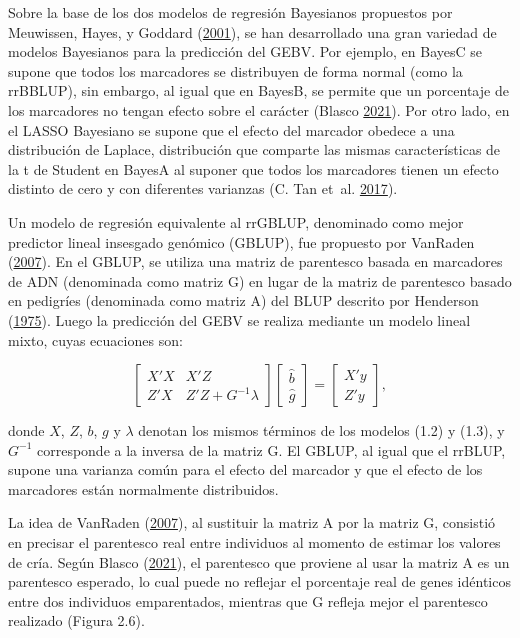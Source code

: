 \documentclass[11pt,spanish,a4paper,oneside,]{book} %
\begin{document}
Sobre la base de los dos modelos de regresión Bayesianos propuestos por Meuwissen, Hayes, y Goddard (\protect\hyperlink{ref-cite:8}{2001}), se han desarrollado una gran variedad de modelos Bayesianos para la predicción del GEBV. Por ejemplo, en BayesC se supone que todos los marcadores se distribuyen de forma normal (como la rrBBLUP), sin embargo, al igual que en BayesB, se permite que un porcentaje de los marcadores no tengan efecto sobre el carácter (Blasco \protect\hyperlink{ref-cite:21}{2021}). Por otro lado, en el LASSO Bayesiano se supone que el efecto del marcador obedece a una distribución de Laplace, distribución que comparte las mismas características de la t de Student en BayesA al suponer que todos los marcadores tienen un efecto distinto de cero y con diferentes varianzas (C. Tan et~al. \protect\hyperlink{ref-cite:34}{2017}).

Un modelo de regresión equivalente al rrGBLUP, denominado como mejor predictor lineal insesgado genómico (GBLUP), fue propuesto por VanRaden (\protect\hyperlink{ref-cite:39}{2007}). En el GBLUP, se utiliza una matriz de parentesco basada en marcadores de ADN (denominada como matriz G) en lugar de la matriz de parentesco basado en pedigríes (denominada como matriz A) del BLUP descrito por Henderson (\protect\hyperlink{ref-cite:41}{1975}). Luego la predicción del GEBV se realiza mediante un modelo lineal mixto, cuyas ecuaciones son:

\begin{equation}
\begin{bmatrix}
X'X & X'Z \\
Z'X & Z'Z + G^{-1} \lambda
\end{bmatrix}
\begin{bmatrix}
\hat{b} \\
\hat{g}
\end{bmatrix}
=
\begin{bmatrix}
X'y \\
Z'y
\end{bmatrix}
,
\end{equation}

donde \(X\), \(Z\), \(b\), \(g\) y \(\lambda\) denotan los mismos términos de los modelos (1.2) y (1.3), y \(G^{-1}\) corresponde a la inversa de la matriz G. El GBLUP, al igual que el rrBLUP, supone una varianza común para el efecto del marcador y que el efecto de los marcadores están normalmente distribuidos.

La idea de VanRaden (\protect\hyperlink{ref-cite:39}{2007}), al sustituir la matriz A por la matriz G, consistió en precisar el parentesco real entre individuos al momento de estimar los valores de cría. Según Blasco (\protect\hyperlink{ref-cite:21}{2021}), el parentesco que proviene al usar la matriz A es un parentesco esperado, lo cual puede no reflejar el porcentaje real de genes idénticos entre dos individuos emparentados, mientras que G refleja mejor el parentesco realizado (Figura 2.6).
\end{document}
